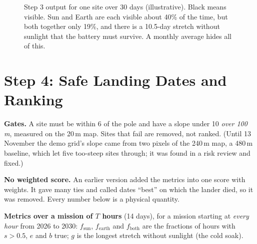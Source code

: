 \documentclass[11pt,a4paper]{article}
\begin{document}
\begin{figure}[ht]
\centering
{}
\caption{Step 3 output for one site over 30 days (illustrative). Black means visible. Sun and Earth are each visible about 40\% of the time, but both together only 19\%, and there is a 10.5-day stretch without sunlight that the battery must survive. A monthly average hides all of this.}
\label{fig:timeline}
\end{figure}

\section{Step 4: Safe Landing Dates and Ranking}

\textbf{Gates.} A site must be within 6\textdegree{} of the pole and have a slope under 10\textdegree{} \emph{over 100\,m}, measured on the 20\,m map. Sites that fail are removed, not ranked. (Until 13 November the demo grid's slope came from two pixels of the 240\,m map, a 480\,m baseline, which let five too-steep sites through; it was found in a risk review and fixed.)

\textbf{No weighted score.} An earlier version added the metrics into one score with weights. It gave many ties and called dates ``best'' on which the lander died, so it was removed. Every number below is a physical quantity.

\textbf{Metrics over a mission of $T$ hours} (14 days), for a mission starting at \emph{every hour} from 2026 to 2030: $f_\text{sun}$, $f_\text{earth}$ and $f_\text{both}$ are the fractions of hours with $s>0.5$, $e$ and $b$ true; $g$ is the longest stretch without sunlight (the cold soak).
\end{document}
